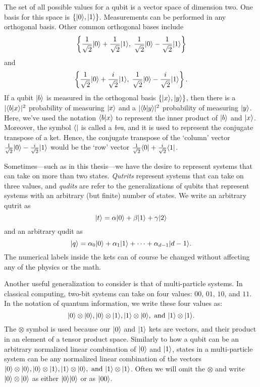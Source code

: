 The set of all possible values for a qubit is a vector space of dimension two. One basis for this space is $\{| 0 \rangle, | 1 \rangle\}$. Measurements can be performed in any orthogonal basis. Other common orthogonal bases include
\[
\left\{\frac{1}{\sqrt{2}}| 0 \rangle + \frac{1}{\sqrt{2}}| 1 \rangle, \; \frac{1}{\sqrt{2}}| 0 \rangle -\frac{1}{\sqrt{2}} | 1 \rangle\right\}
\] and
\[
\left\{\frac{1}{\sqrt{2}}| 0 \rangle + \frac{i}{\sqrt{2}}| 1 \rangle, \; \frac{1}{\sqrt{2}}| 0 \rangle -\frac{i}{\sqrt{2}} | 1 \rangle\right\}.
\] If a qubit $| b \rangle$ is measured in the orthogonal basis $\{| x \rangle, | y \rangle\}$, then there is a $|\langle b | x \rangle|^2$ probability of measuring $| x \rangle$ and a $|\langle b | y \rangle|^2$ probability of measuring $| y \rangle$.   Here, we've used the notation $\langle b | x \rangle$ to represent the inner product of $| b \rangle$ and $| x \rangle$. Moreover, the symbol $\langle  |$ is called a \textit{bra}, and it is used to represent the conjugate transpose of a ket.  Hence, the conjugate transpose of the `column' vector $\frac{1}{\sqrt{2}}| 0 \rangle -\frac{i}{\sqrt{2}} | 1 \rangle$ would be the `row' vector $\frac{1}{\sqrt{2}}\langle 0 | + \frac{i}{\sqrt{2}} \langle 1 |$. 



Sometimes---such as in this thesis---we have the desire to represent systems that can take on more than two states. \textit{Qutrits} represent systems that can take on three values, and \textit{qudits} are refer to the generalizations of qubits that represent systems with an arbitrary (but finite) number of states. We write an arbitrary qutrit as 
\[
| t \rangle = \alpha | 0 \rangle + \beta | 1 \rangle + \gamma | 2 \rangle
\]
and an arbitrary qudit as
\[
| q \rangle = \alpha_0 | 0 \rangle + \alpha_1 | 1 \rangle + \cdots + \alpha_{d-1} | d-1 \rangle.
\] The numerical labels inside the kets can of course be changed without affecting any of the physics or the math.


Another useful generalization to consider is that of multi-particle systems. In classical computing, two-bit systems can take on four values: $00$, $01$, $10$, and $11$. In the notation of quantum information, we write these four values as: 
\[
| 0 \rangle \otimes | 0 \rangle, | 0 \rangle \otimes | 1 \rangle, | 1 \rangle \otimes | 0 \rangle, \text{ and } | 1 \rangle \otimes | 1 \rangle.
\] The $\otimes$ symbol is used because our $| 0 \rangle$ and $| 1 \rangle$ kets are vectors, and their product in an element of a tensor product space. Similarly to how a qubit can be an arbitrary normalized linear combination of $| 0 \rangle$ and $| 1 \rangle$, states in a multi-particle system can be any normalized linear combination of the vectors $| 0 \rangle \otimes | 0 \rangle, | 0 \rangle \otimes | 1 \rangle, | 1 \rangle \otimes | 0 \rangle, \text{ and } | 1 \rangle \otimes | 1 \rangle$. Often we will omit the $\otimes$ and write $| 0 \rangle \otimes | 0 \rangle$ as either $| 0 \rangle | 0 \rangle$ or as $| 00 \rangle$.


